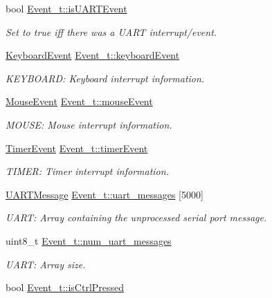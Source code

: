 \begin{DoxyCompactItemize}
bool \mbox{\hyperlink{group__event_ga90aa0e2d62ddd6a7df1d4028f5598871}{Event\+\_\+t\+::is\+U\+A\+R\+T\+Event}}
\begin{DoxyCompactList}\small\item\em Set to true iff there was a U\+A\+RT interrupt/event. \end{DoxyCompactList}\item 
\mbox{\hyperlink{struct_keyboard_event}{Keyboard\+Event}} \mbox{\hyperlink{group__event_ga7754ae75522696c89ae768740cb2720c}{Event\+\_\+t\+::keyboard\+Event}}
\begin{DoxyCompactList}\small\item\em K\+E\+Y\+B\+O\+A\+RD\+: Keyboard interrupt information. \end{DoxyCompactList}\item 
\mbox{\hyperlink{struct_mouse_event}{Mouse\+Event}} \mbox{\hyperlink{group__event_ga0cf4f0e41d1890283cf4ac717a7caee7}{Event\+\_\+t\+::mouse\+Event}}
\begin{DoxyCompactList}\small\item\em M\+O\+U\+SE\+: Mouse interrupt information. \end{DoxyCompactList}\item 
\mbox{\hyperlink{struct_timer_event}{Timer\+Event}} \mbox{\hyperlink{group__event_ga00faceeda48c11ab73d93386410fb947}{Event\+\_\+t\+::timer\+Event}}
\begin{DoxyCompactList}\small\item\em T\+I\+M\+ER\+: Timer interrupt information. \end{DoxyCompactList}\item 
\mbox{\hyperlink{struct_u_a_r_t_message}{U\+A\+R\+T\+Message}} \mbox{\hyperlink{group__event_ga5328c084dbec907fc5764e3bc22d15c1}{Event\+\_\+t\+::uart\+\_\+messages}} \mbox{[}5000\mbox{]}
\begin{DoxyCompactList}\small\item\em U\+A\+RT\+: Array containing the unprocessed serial port message. \end{DoxyCompactList}\item 
uint8\+\_\+t \mbox{\hyperlink{group__event_ga06510bc0368c992c639e98d32ddf1f08}{Event\+\_\+t\+::num\+\_\+uart\+\_\+messages}}
\begin{DoxyCompactList}\small\item\em U\+A\+RT\+: Array size. \end{DoxyCompactList}\item 
bool \mbox{\hyperlink{group__event_ga6889574ecb91bfdbfb6970744500343d}{Event\+\_\+t\+::is\+Ctrl\+Pressed}}

\end{DoxyCompactItemize}
